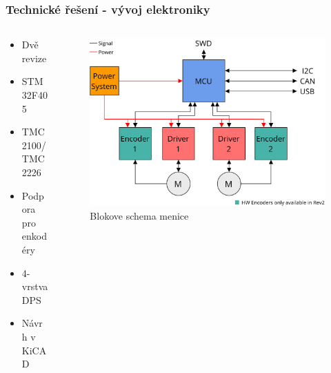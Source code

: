 \documentclass[%
  12pt,       				%
	t,                  %
	aspectratio=1610,   %
	unicode,						%
]{beamer}				    	%
\begin{document}
\begin{frame}
	\frametitle{Technické řešení - vývoj elektroniky}
	\begin{columns}[T] 								%
		\begin{column}{0.4\textwidth}
			\begin{itemize}
				\item Dvě revize
				\item STM32F405
				\item TMC2100/TMC2226
				\item Podpora pro enkodéry
				\item 4-vrstva DPS
				\item Návrh v KiCAD
			\end{itemize}
		\end{column}
		\begin{column}{0.6\textwidth}		%
			\begin{figure}%
				\centering              %
				\includegraphics[width=0.8\columnwidth]{../Thesis/obrazky/sm4_block_diagram}
				\caption{Blokove schema menice}%
				\label{fig:sm4_block}
			\end{figure}
		\end{column}
	\end{columns}
\end{frame}
\end{document}
